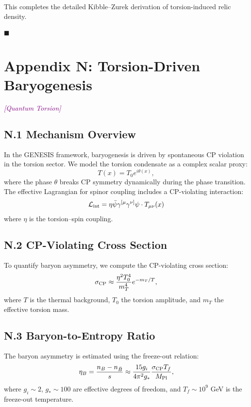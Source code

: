 \documentclass{article}
\newcommand{\quantumtag}{\textcolor{purple}{\textit{[Quantum Torsion]}}}
\begin{document}
\vspace{1em}
This completes the detailed Kibble–Zurek derivation of torsion-induced relic density.

\hfill $\blacksquare$







\section*{Appendix N: Torsion-Driven Baryogenesis}
\label{app:baryogenesis}
\quantumtag


\subsection*{N.1 Mechanism Overview}
In the GENESIS framework, baryogenesis is driven by spontaneous CP violation in the torsion sector. We model the torsion condensate as a complex scalar proxy:
\begin{equation}
T(x) = T_0 e^{i\theta(x)},
\end{equation}
where the phase $\theta$ breaks CP symmetry dynamically during the phase transition. The effective Lagrangian for spinor coupling includes a CP-violating interaction:
\begin{equation}
\mathcal{L}_{\rm int} = \eta \bar{\psi} \gamma^{[\mu} \gamma^{\nu]} \psi \cdot T_{\mu\nu}(x)
\end{equation}
where $\eta$ is the torsion–spin coupling.

\subsection*{N.2 CP-Violating Cross Section}
To quantify baryon asymmetry, we compute the CP-violating cross section:
\begin{equation}
\sigma_{\rm CP} \approx \frac{\eta^2 T_0^4}{m_T^4} e^{-m_T/T},
\end{equation}
where $T$ is the thermal background, $T_0$ the torsion amplitude, and $m_T$ the effective torsion mass.

\subsection*{N.3 Baryon-to-Entropy Ratio}
The baryon asymmetry is estimated using the freeze-out relation:
\begin{equation}
\eta_B = \frac{n_B - n_{\bar{B}}}{s} \approx \frac{15 g_i}{4\pi^2 g_*} \frac{\sigma_{\rm CP} T_f}{M_{\rm Pl}},
\end{equation}
where $g_i \sim 2$, $g_* \sim 100$ are effective degrees of freedom, and $T_f \sim 10^9$ GeV is the freeze-out temperature.
\end{document}
